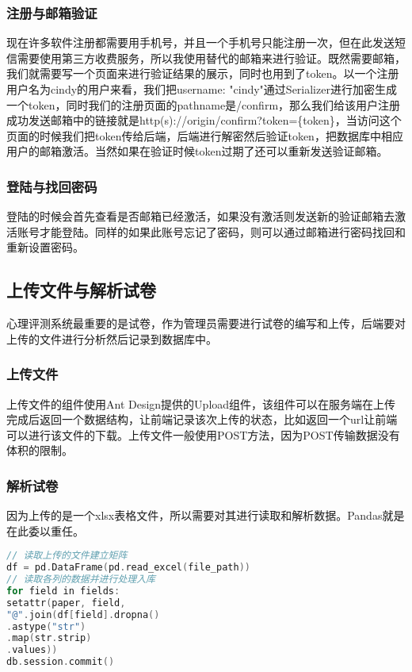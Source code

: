 \subsubsection{注册与邮箱验证}

现在许多软件注册都需要用手机号，并且一个手机号只能注册一次，但在此发送短信需要使用第三方收费服务，所以我使用替代的邮箱来进行验证。既然需要邮箱，我们就需要写一个页面来进行验证结果的展示，同时也用到了token。以一个注册用户名为cindy的用户来看，我们把{username: "cindy"}通过Serializer进行加密生成一个token，同时我们的注册页面的pathname是/confirm，那么我们给该用户注册成功发送邮箱中的链接就是http(s)://origin/confirm?token=\{token\}，当访问这个页面的时候我们把token传给后端，后端进行解密然后验证token，把数据库中相应用户的邮箱激活。当然如果在验证时候token过期了还可以重新发送验证邮箱。

\subsubsection{登陆与找回密码}

登陆的时候会首先查看是否邮箱已经激活，如果没有激活则发送新的验证邮箱去激活账号才能登陆。同样的如果此账号忘记了密码，则可以通过邮箱进行密码找回和重新设置密码。

\subsection{上传文件与解析试卷}

心理评测系统最重要的是试卷，作为管理员需要进行试卷的编写和上传，后端要对上传的文件进行分析然后记录到数据库中。

\subsubsection{上传文件}

上传文件的组件使用Ant Design提供的Upload组件，该组件可以在服务端在上传完成后返回一个数据结构，让前端记录该次上传的状态，比如返回一个url让前端可以进行该文件的下载。上传文件一般使用POST方法，因为POST传输数据没有体积的限制。

\subsubsection{解析试卷}

因为上传的是一个xlsx表格文件，所以需要对其进行读取和解析数据。Pandas就是在此委以重任。

\begin{lstlisting}[language=C]
// 读取上传的文件建立矩阵
df = pd.DataFrame(pd.read_excel(file_path))
// 读取各列的数据并进行处理入库
for field in fields:
setattr(paper, field, 
"@".join(df[field].dropna()
.astype("str")
.map(str.strip)
.values))
db.session.commit()
\end{lstlisting}

